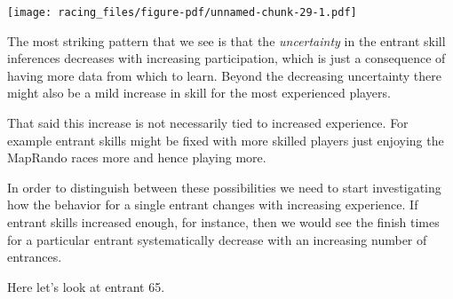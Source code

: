 \documentclass[
  letterpaper,
  DIV=11,
  numbers=noendperiod]{scrartcl}
\begin{document}
\texttt{[image: racing\_files/figure-pdf/unnamed-chunk-29-1.pdf]}

The most striking pattern that we see is that the \emph{uncertainty} in
the entrant skill inferences decreases with increasing participation,
which is just a consequence of having more data from which to learn.
Beyond the decreasing uncertainty there might also be a mild increase in
skill for the most experienced players.

That said this increase is not necessarily tied to increased experience.
For example entrant skills might be fixed with more skilled players just
enjoying the MapRando races more and hence playing more.

In order to distinguish between these possibilities we need to start
investigating how the behavior for a single entrant changes with
increasing experience. If entrant skills increased enough, for instance,
then we would see the finish times for a particular entrant
systematically decrease with an increasing number of entrances.

Here let's look at entrant 65.
\end{document}
